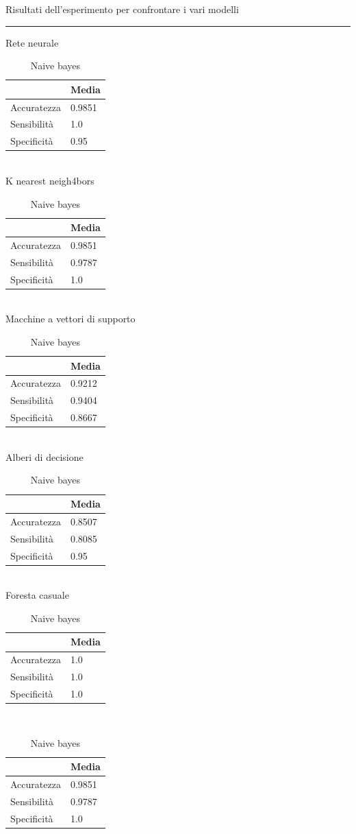 \documentclass[a4paper,12pt]{report}
\begin{document}
\begin{table}
\caption{Risultati dell'esperimento per confrontare i vari modelli}
\rule{\textwidth}{0.25mm}

\caption{Rete neurale}
\begin{tabular}{|l|l|}
\hline
			& Media     \\ \hline
Accuratezza & 0.9851    \\ \hline
Sensibilità &    1.0    \\ \hline
Specificità &   0.95    \\ \hline
\end{tabular}
\\

\caption{K nearest neigh4bors}
\begin{tabular}{|l|l|}
\hline
			& Media     \\ \hline
Accuratezza & 0.9851    \\ \hline
Sensibilità & 0.9787    \\ \hline
Specificità &    1.0    \\ \hline
\end{tabular}
\\


\caption{Macchine a vettori di supporto}
\begin{tabular}{|l|l|}
\hline
			& Media     \\ \hline
Accuratezza & 0.9212	\\ \hline
Sensibilità & 0.9404	\\ \hline
Specificità & 0.8667	\\ \hline
\end{tabular}
\\


\caption{Alberi di decisione}
\begin{tabular}{|l|l|}
\hline
			& Media     \\ \hline
Accuratezza & 0.8507    \\ \hline
Sensibilità & 0.8085    \\ \hline
Specificità &   0.95    \\ \hline
\end{tabular}
\\


\caption{Foresta casuale}
\begin{tabular}{|l|l|}
\hline
			& Media   	\\ \hline
Accuratezza & 1.0    	\\ \hline
Sensibilità & 1.0    	\\ \hline
Specificità & 1.0    	\\ \hline
\end{tabular}
\\


\caption{Naive bayes}
\begin{tabular}{|l|l|}
\hline
			& Media   \\ \hline
Accuratezza & 0.9851  \\ \hline
Sensibilità & 0.9787  \\ \hline
Specificità &    1.0  \\ \hline
\end{tabular}

\end{table}
\end{document}

